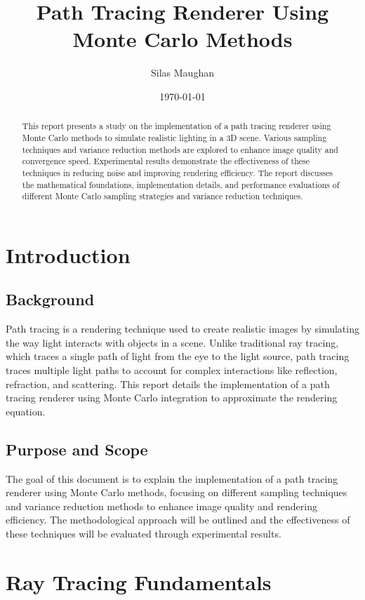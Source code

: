 \documentclass[12pt]{article}
\title{Path Tracing Renderer Using Monte Carlo Methods}
\author{Silas Maughan}
\date{\today}
\begin{document}
\maketitle

\begin{abstract}
    This report presents a study on the implementation of a path tracing renderer using Monte Carlo methods to simulate realistic lighting in a 3D scene. Various sampling techniques and variance reduction methods are explored to enhance image quality and convergence speed. Experimental results demonstrate the effectiveness of these techniques in reducing noise and improving rendering efficiency. The report discusses the mathematical foundations, implementation details, and performance evaluations of different Monte Carlo sampling strategies and variance reduction techniques.
\end{abstract}

\tableofcontents

\section{Introduction}
\label{sec:intro}
\subsection{Background}
Path tracing is a rendering technique used to create realistic images by simulating the way light interacts with objects in a scene. Unlike traditional ray tracing, which traces a single path of light from the eye to the light source, path tracing traces multiple light paths to account for complex interactions like reflection, refraction, and scattering. This report details the implementation of a path tracing renderer using Monte Carlo integration to approximate the rendering equation.
\subsection{Purpose and Scope}
The goal of this document is to explain the implementation of a path tracing renderer using Monte Carlo methods, focusing on different sampling techniques and variance reduction methods to enhance image quality and rendering efficiency. The methodological approach will be outlined and the effectiveness of these techniques will be evaluated through experimental results.

\section{Ray Tracing Fundamentals}
\label{sec:fundamentals}
\end{document}
